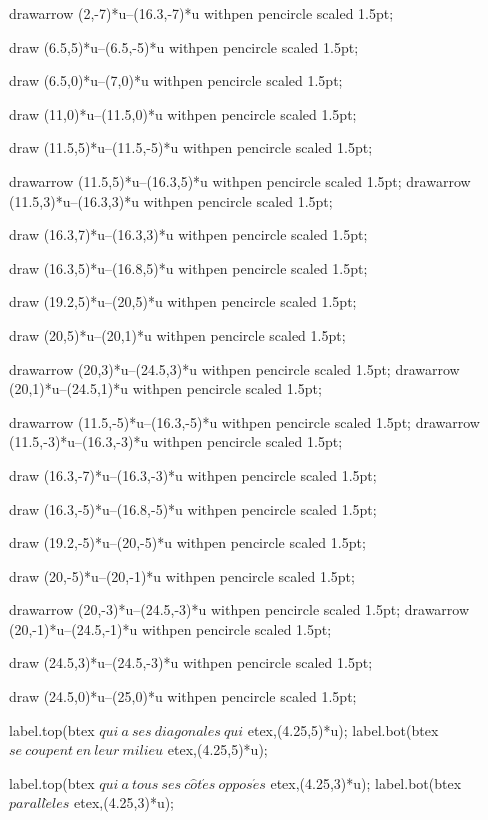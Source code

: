 \documentclass[12pt]{article}
\begin{document}
drawarrow (2,-7)*u--(16.3,-7)*u withpen pencircle scaled 1.5pt;

draw (6.5,5)*u--(6.5,-5)*u withpen pencircle scaled 1.5pt;

draw (6.5,0)*u--(7,0)*u withpen pencircle scaled 1.5pt;

draw (11,0)*u--(11.5,0)*u withpen pencircle scaled 1.5pt;

draw (11.5,5)*u--(11.5,-5)*u withpen pencircle scaled 1.5pt;

drawarrow (11.5,5)*u--(16.3,5)*u withpen pencircle scaled 1.5pt;
drawarrow (11.5,3)*u--(16.3,3)*u withpen pencircle scaled 1.5pt;

draw (16.3,7)*u--(16.3,3)*u withpen pencircle scaled 1.5pt;

draw (16.3,5)*u--(16.8,5)*u withpen pencircle scaled 1.5pt;

draw (19.2,5)*u--(20,5)*u withpen pencircle scaled 1.5pt;

draw (20,5)*u--(20,1)*u withpen pencircle scaled 1.5pt;

drawarrow (20,3)*u--(24.5,3)*u withpen pencircle scaled 1.5pt;
drawarrow (20,1)*u--(24.5,1)*u withpen pencircle scaled 1.5pt;



drawarrow (11.5,-5)*u--(16.3,-5)*u withpen pencircle scaled 1.5pt;
drawarrow (11.5,-3)*u--(16.3,-3)*u withpen pencircle scaled 1.5pt;

draw (16.3,-7)*u--(16.3,-3)*u withpen pencircle scaled 1.5pt;

draw (16.3,-5)*u--(16.8,-5)*u withpen pencircle scaled 1.5pt;

draw (19.2,-5)*u--(20,-5)*u withpen pencircle scaled 1.5pt;

draw (20,-5)*u--(20,-1)*u withpen pencircle scaled 1.5pt;

drawarrow (20,-3)*u--(24.5,-3)*u withpen pencircle scaled 1.5pt;
drawarrow (20,-1)*u--(24.5,-1)*u withpen pencircle scaled 1.5pt;


draw (24.5,3)*u--(24.5,-3)*u withpen pencircle scaled 1.5pt;

draw (24.5,0)*u--(25,0)*u withpen pencircle scaled 1.5pt;










label.top(btex $ qui~a~ses~diagonales~qui $ etex,(4.25,5)*u);
label.bot(btex $ se~coupent~en~leur~milieu $ etex,(4.25,5)*u);

label.top(btex $ qui~a~tous~ses~c\hat{o}t\acute{e}s~oppos\acute{e}s $ etex,(4.25,3)*u);
label.bot(btex $ parall\grave{e}les $ etex,(4.25,3)*u);
\end{document}
